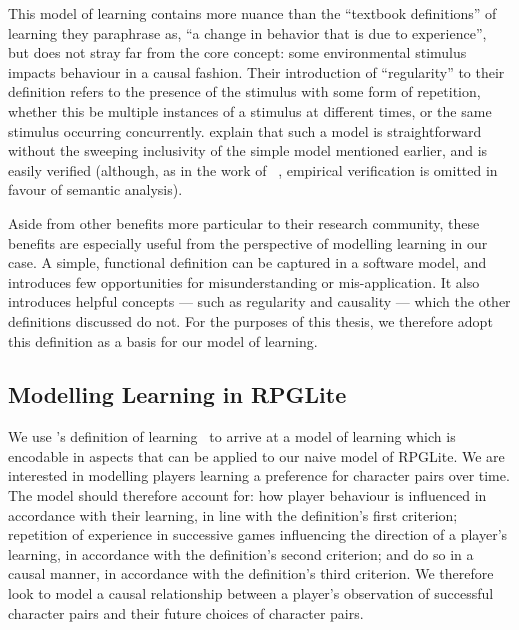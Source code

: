 This model of learning contains more nuance than the ``textbook definitions'' of
learning they paraphrase as, ``a change in behavior that is due to experience'',
but does not stray far from the core concept: some environmental stimulus
impacts behaviour in a causal fashion. Their introduction of ``regularity'' to
their definition refers to the presence of the stimulus with some form of
repetition, whether this be multiple instances of a stimulus at different times,
or the same stimulus occurring concurrently. \citeauthor{de2013learning} explain
that such a model is straightforward without the sweeping inclusivity of the
simple model mentioned earlier, and is easily verified (although, as in the work
of \citeauthor{lachman1997learning}~\cite{lachman1997learning}, empirical
verification is omitted in favour of semantic analysis).

Aside from other benefits more particular to their research community, these
benefits are especially useful from the perspective of modelling learning in our
case. A simple, functional definition can be captured in a software model, and
introduces few opportunities for misunderstanding or mis-application. It also
introduces helpful concepts --- such as regularity and causality --- which the
other definitions discussed do not. For the purposes of this thesis, we
therefore adopt this definition as a basis for our model of learning.

\subsection{Modelling Learning in RPGLite}\label{subsec:defining_our_models_of_learning}

We use \citeauthor{de2013learning}'s definition of
learning~\cite{de2013learning} to arrive at a model of learning which is
encodable in aspects that can be applied to our naive model of RPGLite. We are
interested in modelling players learning a preference for character pairs over
time. The model should therefore account for: how player behaviour is influenced
in accordance with their learning, in line with the definition's first
criterion; repetition of experience in successive games influencing the
direction of a player's learning, in accordance with the definition's second
criterion; and do so in a causal manner, in accordance with the definition's
third criterion. We therefore look to model a causal relationship between a
player's observation of successful character pairs and their future choices of
character pairs.

